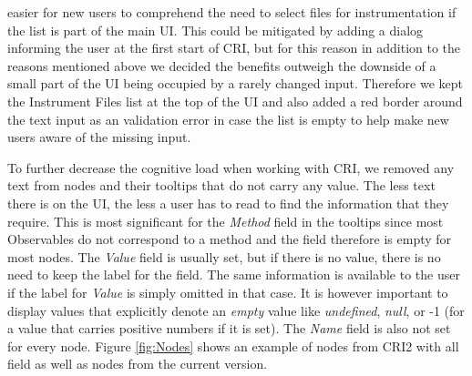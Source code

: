 easier for new users to comprehend the need to select files for instrumentation if the list is part of the main UI. This could be mitigated by adding a dialog informing the user at the first start of CRI, but for this reason in addition to the reasons mentioned above we decided the benefits outweigh the downside of a small part of the UI being occupied by a rarely changed input. Therefore we kept the Instrument Files list at the top of the UI and also added a red border around the text input as an validation error in case the list is empty to help make new users aware of the missing input.

To further decrease the cognitive load when working with CRI, we removed any text from nodes and their tooltips that do not carry any value. The less text there is on the UI, the less a user has to read to find the information that they require. This is most significant for the \emph{Method} field in the tooltips since most Observables do not correspond to a method and the field therefore is empty for most nodes. The \emph{Value} field is usually set, but if there is no value, there is no need to keep the label for the field. The same information is available to the user if the label for \emph{Value} is simply omitted in that case.
It is however important to display values that explicitly denote an \emph{empty} value like \emph{undefined}, \emph{null}, or -1 (for a value that carries positive numbers if it is set). The \emph{Name} field is also not set for every node. Figure \ref{fig:Nodes} shows an example of nodes from CRI2 with all field as well as nodes from the current version.

